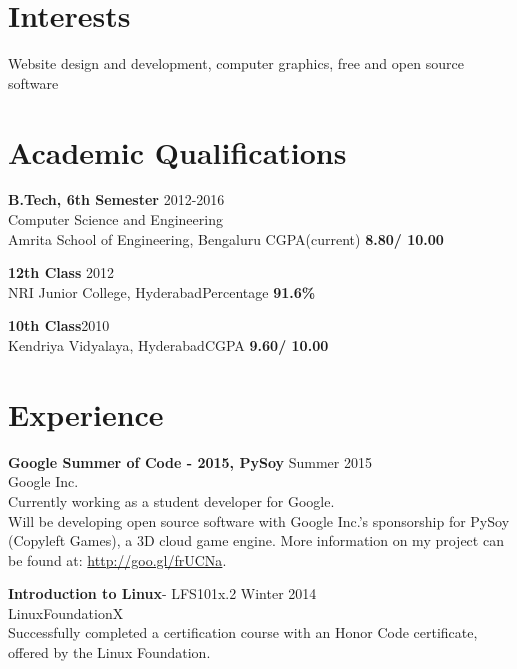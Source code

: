 \documentclass[margin]{res}
\begin{document}
 

\address{\Large {\bf{Sricharan Chiruvolu}}\\[10pt]{\bf (+91) 9035 886166 } \\ {\bf \underline{sricharanized@gmail.com}}
        }
\address{\# 430, Mathura block \\ Amrita School of Engineering  \\
         Kasavanahalli, Bengaluru \\ India - 560035}
 
\begin{resume}

	
\section{Interests} 
 Website design and development, computer graphics, free and open source software

\section{Academic Qualifications}
{\bf B.Tech, 6th Semester} \hfill 2012-2016
 \\Computer Science and Engineering\\ Amrita School of Engineering, Bengaluru \hfill CGPA(current) {\bf 8.80/ 10.00}

{\bf 12th Class} \hfill 2012
\\NRI Junior College, Hyderabad\hfill Percentage {\bf 91.6\% }

{\bf 10th Class}\hfill 2010
 \\ Kendriya Vidyalaya, Hyderabad\hfill CGPA {\bf 9.60/ 10.00}


\section{Experience}
	
	{\bf Google Summer of Code - 2015, PySoy} \hfill Summer  2015
	\\Google Inc.
	\\Currently working as a student developer for Google.\\ Will be developing open source software with Google Inc.'s sponsorship for PySoy (Copyleft Games), a 3D cloud game engine.  More information on my project can be found at: \underline{http://goo.gl/frUCNa}.

 {\bf Introduction to Linux}- LFS101x.2 \hfill Winter  2014
	\\LinuxFoundationX
	\\Successfully completed a certification course with an Honor Code certificate, offered by the Linux Foundation.
	

\end{resume}
\end{document}
